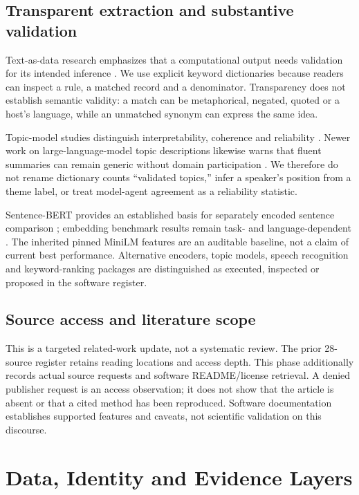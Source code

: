\subsection{Transparent extraction and substantive validation}
Text-as-data research emphasizes that a computational output needs validation for its intended inference \citep{grimmer2013text}. We use explicit keyword dictionaries because readers can inspect a rule, a matched record and a denominator. Transparency does not establish semantic validity: a match can be metaphorical, negated, quoted or a host's language, while an unmatched synonym can express the same idea.

Topic-model studies distinguish interpretability, coherence and reliability \citep{chang2009reading,doogan2021twaddle,hoyle2021incoherence,schroeder2025reliability}. Newer work on large-language-model topic descriptions likewise warns that fluent summaries can remain generic without domain participation \citep{li2025haystack}. We therefore do not rename dictionary counts ``validated topics,'' infer a speaker's position from a theme label, or treat model-agent agreement as a reliability statistic.

Sentence-BERT provides an established basis for separately encoded sentence comparison \citep{reimers2019sentencebert}; embedding benchmark results remain task- and language-dependent \citep{muennighoff2023mteb,enevoldsen2025mmteb}. The inherited pinned MiniLM features are an auditable baseline, not a claim of current best performance. Alternative encoders, topic models, speech recognition and keyword-ranking packages are distinguished as executed, inspected or proposed in the software register.

\subsection{Source access and literature scope}
This is a targeted related-work update, not a systematic review. The prior 28-source register retains reading locations and access depth. This phase additionally records actual source requests and software README/license retrieval. A denied publisher request is an access observation; it does not show that the article is absent or that a cited method has been reproduced. Software documentation establishes supported features and caveats, not scientific validation on this discourse.

\section{Data, Identity and Evidence Layers}
